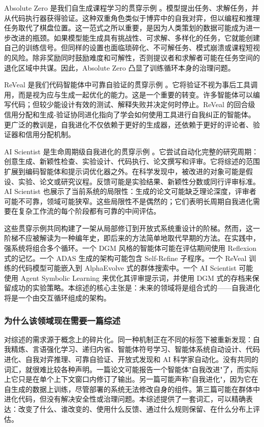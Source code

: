 Absolute Zero 是我们自生成课程学习的贯穿示例 \cite{absolutezero2025}。模型提出任务、求解任务，并从代码执行器获得验证。这种双重角色类似于博弈中的自我对弈，但以编程和推理任务取代了棋盘位置。这一范式之所以重要，是因为人类策划的数据可能成为进一步改进的瓶颈。如果模型能生成具有挑战性、可求解、多样化的任务，它就能创建自己的训练信号。但同样的设置也面临琐碎化、不可解任务、模式崩溃或课程短视的风险。除非奖励同时鼓励难度和可解性，否则提议者和求解者可能在任务空间的退化区域中共谋。因此，Absolute Zero 凸显了训练循环本身的治理问题。

ReVeal 是我们代码智能体中可靠自验证的贯穿示例 \cite{reveal2025}。它将验证不视为事后工具调用，而是视为应与生成一起优化的能力。这是一个重要的转变。许多智能体可以编写代码；但较少能设计有效的测试、解释失败并决定何时停止。ReVeal 的回合级信用分配和生成-验证协同进化指向了学会如何使用工具进行自我纠正的智能体。更广泛的教训是，自我进化不仅依赖于更好的生成器，还依赖于更好的评论者、验证器和信用分配机制。

AI Scientist 是生命周期级自我进化的贯穿示例 \cite{aiscientist2024}。它尝试自动化完整的研究周期：创意生成、新颖性检查、实验设计、代码执行、论文撰写和评审。它将综述的范围扩展到编码智能体和提示词优化器之外。在科学发现中，被改进的对象可能是假设、实验、论文或研究议程。反馈可能是实验结果、新颖性分数或同行评审标准。AI Scientist 也展示了当前系统的局限性：生成的论文可能缺乏理论深度，评审者可能不可靠，领域可能狭窄。这些局限性不是偶然的；它们表明长周期自我进化需要在复杂工作流的每个阶段都有可靠的中间评估。

这些贯穿示例共同构建了一架从局部修订到开放式系统重设计的阶梯。然而，这一阶梯不应被解读为一种编年史，即后来的方法简单地取代早期的方法。在实践中，强系统将组合多个循环。一个 DGM 风格的智能体可能在评估期间使用 Reflexion 式的记忆。一个 ADAS 生成的架构可能包含 Self-Refine 子程序。一个 ReVeal 训练的代码模型可能嵌入到 AlphaEvolve 式的群体搜索中。一个 AI Scientist 可能使用 Agent Symbolic Learning 来优化其评审提示词，并使用 DGM 式的存档来保留成功的实验策略。本综述的核心主张是：未来的领域将是组合式的——自我进化将是一个由交互循环组成的架构。

\subsubsection{为什么该领域现在需要一篇综述}

对综述的需求源于概念上的碎片化。同一种机制正在不同的标签下被重新发现：自我精炼、言语强化学习、递归内省、智能体符号学习、智能体系统自动设计、代码进化、自我对弈推理、可靠自验证、开放式发现和 AI 科学家自动化。没有共同的词汇，就很难比较各种声明。一篇论文可能报告一个智能体"自我改进"了，而实际上它只是在单个上下文窗口内修订了输出。另一篇可能声称"自我进化"，因为它在自生成的数据上训练，尽管部署的系统无法修改自身的组件。第三篇可能在群体中进化代码，但没有解决安全性或治理问题。本综述提供了一套词汇，可以精确表达：改变了什么、谁改变的、使用什么反馈、通过什么规则保留、在什么分布上评估。


